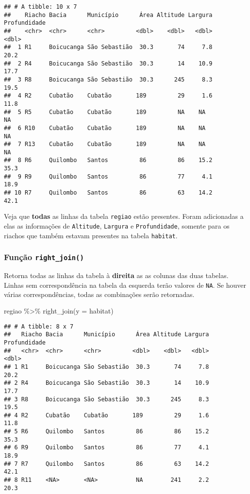 \documentclass[
]{book}
\newenvironment{Shaded}{\begin{snugshade}}{\end{snugshade}}
\newcommand{\AttributeTok}[1]{\textcolor[rgb]{0.77,0.63,0.00}{#1}}
\newcommand{\FunctionTok}[1]{\textcolor[rgb]{0.00,0.00,0.00}{#1}}
\newcommand{\NormalTok}[1]{#1}
\newcommand{\SpecialCharTok}[1]{\textcolor[rgb]{0.00,0.00,0.00}{#1}}
\begin{document}
\begin{verbatim}
## # A tibble: 10 x 7
##    Riacho Bacia      Município      Área Altitude Largura Profundidade
##    <chr>  <chr>      <chr>         <dbl>    <dbl>   <dbl>        <dbl>
##  1 R1     Boicucanga São Sebastião  30.3       74     7.8         20.2
##  2 R4     Boicucanga São Sebastião  30.3       14    10.9         17.7
##  3 R8     Boicucanga São Sebastião  30.3      245     8.3         19.5
##  4 R2     Cubatão    Cubatão       189         29     1.6         11.8
##  5 R5     Cubatão    Cubatão       189         NA    NA           NA  
##  6 R10    Cubatão    Cubatão       189         NA    NA           NA  
##  7 R13    Cubatão    Cubatão       189         NA    NA           NA  
##  8 R6     Quilombo   Santos         86         86    15.2         35.3
##  9 R9     Quilombo   Santos         86         77     4.1         18.9
## 10 R7     Quilombo   Santos         86         63    14.2         42.1
\end{verbatim}

Veja que \textbf{todas} as linhas da tabela \texttt{regiao} estão presentes. Foram adicionadas a elas as informações de \texttt{Altitude}, \texttt{Largura} e \texttt{Profundidade}, somente para os riachos que também estavam presentes na tabela \texttt{habitat}.

\hypertarget{funuxe7uxe3o-right_join}{%
\subsubsection{\texorpdfstring{Função \texttt{right\_join()}}{Função right\_join()}}\label{funuxe7uxe3o-right_join}}

Retorna todas as linhas da tabela à \textbf{direita} as as colunas das duas tabelas. Linhas sem correspondência na tabela da esquerda terão valores de \texttt{NA}. Se houver várias correspondências, todas as combinações serão retornadas.

\begin{Shaded}
\begin{Highlighting}[]
\NormalTok{regiao }\SpecialCharTok{\%\textgreater{}\%} \FunctionTok{right\_join}\NormalTok{(}\AttributeTok{y =}\NormalTok{ habitat)}
\end{Highlighting}
\end{Shaded}

\begin{verbatim}
## # A tibble: 8 x 7
##   Riacho Bacia      Município      Área Altitude Largura Profundidade
##   <chr>  <chr>      <chr>         <dbl>    <dbl>   <dbl>        <dbl>
## 1 R1     Boicucanga São Sebastião  30.3       74     7.8         20.2
## 2 R4     Boicucanga São Sebastião  30.3       14    10.9         17.7
## 3 R8     Boicucanga São Sebastião  30.3      245     8.3         19.5
## 4 R2     Cubatão    Cubatão       189         29     1.6         11.8
## 5 R6     Quilombo   Santos         86         86    15.2         35.3
## 6 R9     Quilombo   Santos         86         77     4.1         18.9
## 7 R7     Quilombo   Santos         86         63    14.2         42.1
## 8 R11    <NA>       <NA>           NA        241     2.2         20.3
\end{verbatim}
\end{document}
